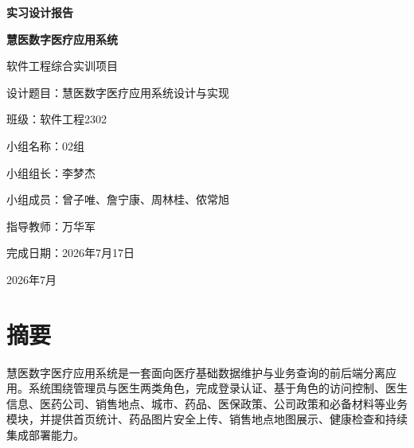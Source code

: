 \documentclass[UTF8,a4paper,12pt,openany,fontset=windows]{ctexrep}
\begin{document}
\songti{}
\hypersetup{pageanchor=false}

\begin{titlepage}
  \thispagestyle{empty}
  \begin{center}
    \vspace*{1.3cm}
    {\heiti{}\bfseries 实习设计报告\par}
    \vspace{1.8cm}
    {\heiti{}\bfseries 慧医数字医疗应用系统\par}
    \vspace{0.8cm}
    {\songti{}软件工程综合实训项目\par}
    \vfill
    \begin{minipage}{0.78\textwidth}
      \noindent\heiti 设计题目：\songti 慧医数字医疗应用系统设计与实现\par\vspace{0.55em}
      \noindent\heiti 班级：\songti 软件工程2302\par\vspace{0.55em}
      \noindent\heiti 小组名称：\songti 02组\par\vspace{0.55em}
      \noindent\heiti 小组组长：\songti 李梦杰\par\vspace{0.55em}
      \noindent\heiti 小组成员：\songti 曾子唯、詹宁康、周林桂、侬常旭\par\vspace{0.55em}
      \noindent\heiti 指导教师：\songti 万华军\par\vspace{0.55em}
      \noindent\heiti 完成日期：\songti 2026年7月17日\par
    \end{minipage}
    \vfill
    {\songti{}2026年7月\par}
  \end{center}
\end{titlepage}

\hypersetup{pageanchor=true}
\chapter*{摘\quad 要}

慧医数字医疗应用系统是一套面向医疗基础数据维护与业务查询的前后端分离应用。系统围绕管理员与医生两类角色，完成登录认证、基于角色的访问控制、医生信息、医药公司、销售地点、城市、药品、医保政策、公司政策和必备材料等业务模块，并提供首页统计、药品图片安全上传、销售地点地图展示、健康检查和持续集成部署能力。
\end{document}
